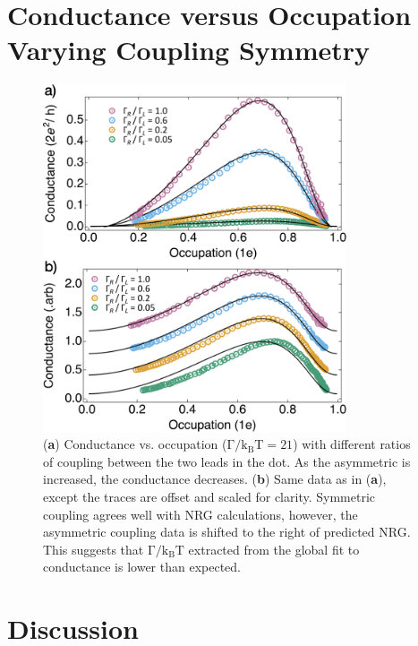 \section{Conductance versus Occupation Varying Coupling Symmetry}



\begin{figure}[!bht]
  \begin{center}
    \includegraphics[width=0.8\textwidth]{figures/ch3/crop_FiguresMaster.019.png}
    \caption[Conductance vs. Occupation : Varying the coupling symmetry between quantum dot and leads]{\label{fig:ch3/cond_occ_assymetry} 
    (\textbf{a}) Conductance vs. occupation ($\mathrm{\Gamma/k_BT=21}$) with different ratios of coupling between the two leads in the dot. As the asymmetric is increased, the conductance decreases.
    (\textbf{b}) Same data as in (\textbf{a}), except the traces are offset and scaled for clarity. Symmetric coupling agrees well with NRG calculations, however, the asymmetric coupling data is shifted to the right of predicted NRG. This suggests that $\mathrm{\Gamma/k_BT}$ extracted from the global fit to conductance is lower than expected. }
  \end{center}
\end{figure}


\section{Discussion}